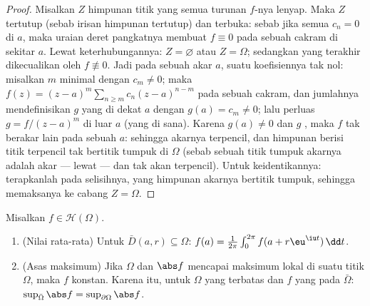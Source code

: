 \begin{proof}
Misalkan $Z$ himpunan titik yang semua turunan $f$-nya
lenyap. Maka $Z$ tertutup (sebab irisan himpunan tertutup) dan terbuka:
sebab jika semua $c_n = 0$ di $a$, maka uraian deret pangkatnya membuat $f
\equiv 0$ pada sebuah cakram di sekitar $a$. Lewat keterhubungannya: $Z =
\varnothing$ atau $Z = \Omega$; sedangkan yang terakhir dikecualikan oleh $f
\not\equiv 0$. Jadi pada sebuah akar $a$, suatu koefisiennya tak nol:
misalkan $m$ minimal dengan $c_m \neq 0$; maka $f(z) = (z -
a)^m\sum_{n\geq m}c_n(z-a)^{n-m}$ pada sebuah cakram, dan jumlahnya
mendefinisikan $g$ yang  di dekat $a$ dengan $g(a) = c_m \neq 0$;
lalu perluas $g = f/(z-a)^m$ di luar $a$ (yang  di sana). Karena
$g(a) \neq 0$ dan $g$ , maka $f$ tak berakar lain pada
sebuah  $a$: sehingga akarnya terpencil, dan himpunan berisi titik
terpencil tak bertitik tumpuk di $\Omega$ (sebab sebuah
titik tumpuk akarnya adalah akar --- lewat  --- dan
tak akan terpencil). Untuk keidentikannya: terapkanlah pada selisihnya,
yang himpunan akarnya bertitik tumpuk, sehingga memaksanya ke
cabang $Z = \Omega$.
\end{proof}

\begin{theorem}
\label{thm:b3:holomorphic:maximum}
Misalkan $f \in \mathcal H(\Omega)$.
\begin{enumerate}
  \item (Nilai rata-rata) Untuk $\bar D(a, r) \subseteq \Omega$:
        $f(a) = \frac1{2\pi}\int_0^{2\pi}f(a +
        r\eu^{\iu t})\,\dd t$.
  \item (Asas maksimum) Jika $\Omega$  dan
        $\abs f$ mencapai maksimum lokal di suatu titik
        $\Omega$, maka $f$ konstan. Karena itu, untuk
        $\Omega$ yang terbatas dan $f$ yang  pada
        $\bar\Omega$: $\sup_{\bar\Omega}\abs f =
        \sup_{\partial\Omega}\abs f$.
\end{enumerate}
\end{theorem}

